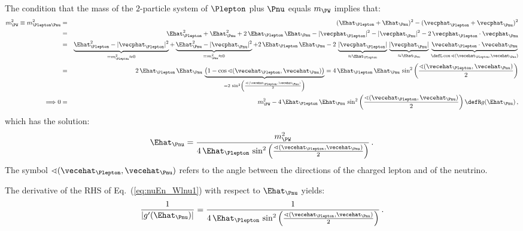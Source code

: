 The condition that the mass of the $2$-particle system of $\Plepton$ plus $\Pnu$ equals $m_{\PW}$ implies that:
\begin{eqnarray}
m_{\PW}^{2} \equiv m_{\Plepton\Pnu}^{2} 
 & = & ( \Ehat_{\Plepton} + \Ehat_{\Pnu} )^{2} - ( \vecphat_{\Plepton} + \vecphat_{\Pnu} )^{2} \nonumber \\
 & = & \Ehat_{\Plepton}^{2} + \Ehat_{\Pnu}^{2} + 2 \, \Ehat_{\Plepton} \, \Ehat_{\Pnu} 
- |\vecphat_{\Plepton}|^{2} - |\vecphat_{\Pnu}|^{2} - 2 \, \vecphat_{\Plepton} \cdot \vecphat_{\Pnu} \nonumber \\
 & = & \underbrace{\Ehat_{\Plepton}^{2} - |\vecphat_{\Plepton}|^{2}}_{= m_{\Plepton}^{2} \approx 0} 
+ \underbrace{\Ehat_{\Pnu}^{2} - |\vecphat_{\Pnu}|^{2}}_{= m_{\Pnu}^{2} \approx 0} 
+ 2 \, \Ehat_{\Plepton} \, \Ehat_{\Pnu} 
- 2 \, \underbrace{|\vecphat_{\Plepton}|}_{\approx \Ehat_{\Plepton}} \, \underbrace{|\vecphat_{\Pnu}|}_{\approx \Ehat_{\Pnu}} \, 
 \underbrace{\vecehat_{\Plepton} \cdot \vecehat_{\Pnu}}_{\defL \cos\sphericalangle(\vecehat_{\Plepton},\vecehat_{\Pnu})} \nonumber \\
 & = & 2 \, \Ehat_{\Plepton} \, \Ehat_{\Pnu} \, 
  \underbrace{\left(1 - \cos\sphericalangle(\vecehat_{\Plepton},\vecehat_{\Pnu})\right)}_{= 2 \, \sin^{2}\left(\frac{\sphericalangle(\vecehat_{\Plepton},\vecehat_{\Pnu})}{2}\right)} 
   = 4 \, \Ehat_{\Plepton} \, \Ehat_{\Pnu} \, \sin^{2}\left(\frac{\sphericalangle(\vecehat_{\Plepton},\vecehat_{\Pnu})}{2}\right) \nonumber \\
\Longrightarrow 0 & = & m_{\PW}^{2} - 4 \, \Ehat_{\Plepton} \, \Ehat_{\Pnu} \, \sin^{2}\left(\frac{\sphericalangle(\vecehat_{\Plepton},\vecehat_{\Pnu})}{2}\right)
  \defR g(\Ehat_{\Pnu}) \, ,
\label{eq:nuEn_Wlnu1}
\end{eqnarray}
which has the solution:
\begin{equation}
\Ehat_{\Pnu} = \frac{m_{\PW}^{2}}{4 \, \Ehat_{\Plepton} \, \sin^{2}\left(\frac{\sphericalangle(\vecehat_{\Plepton},\vecehat_{\Pnu})}{2}\right)} \, .
\label{eq:nuEn_Wlnu2}
\end{equation}
The symbol $\sphericalangle(\vecehat_{\Plepton},\vecehat_{\Pnu})$ refers to the angle between the directions of the charged lepton and of the neutrino.

The derivative of the RHS of Eq.~(\ref{eq:nuEn_Wlnu1}) with respect to $\Ehat_{\Pnu}$ yields:
\begin{equation}
\frac{1}{|g^{\prime}(\Ehat_{\Pnu})|} 
 = \frac{1}{4 \, \Ehat_{\Plepton} \, \sin^{2}\left(\frac{\sphericalangle(\vecehat_{\Plepton},\vecehat_{\Pnu})}{2}\right)} \, . 
\label{eq:nuEn_Wlnu3}
\end{equation}

